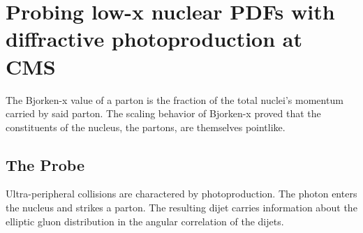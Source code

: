 
\chapter{Probing low-x nuclear PDFs with diffractive photoproduction at CMS}

The Bjorken-x value of a parton is the fraction of the total nuclei's momentum carried by said parton. The scaling behavior of Bjorken-x proved that the constituents of the nucleus, the partons, are themselves pointlike.

\section{The Probe}

Ultra-peripheral collisions are charactered by photoproduction. The photon enters the nucleus and strikes a parton. The resulting dijet carries information about the elliptic gluon distribution in the angular correlation of the dijets.
